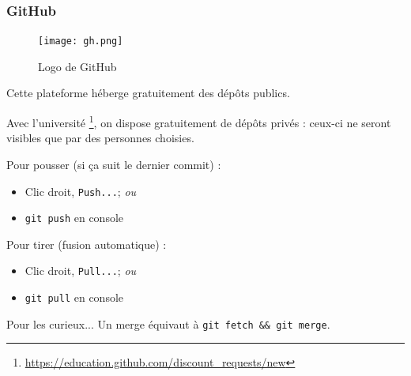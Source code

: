 \documentclass[compress]{beamer}
\newenvironment{curieux}
	{\begin{block}{Pour les curieux...}}
	{\end{block}}
\begin{document}
\begin{frame}
	\frametitle{GitHub}\label{f:gh}
	\begin{figure}[h]
		\centering
		\texttt{[image: gh.png]}
		\caption{Logo de GitHub}
	\end{figure}
	Cette plateforme héberge gratuitement des dépôts publics.

	Avec l'université
	\footnote{\url{https://education.github.com/discount_requests/new}},
	on dispose gratuitement de dépôts privés :
	ceux-ci ne seront visibles que par des personnes choisies.

	Pour pousser (si ça suit le dernier commit) :
	\begin{itemize}
		\item Clic droit, \texttt{Push...}; \textit{ou} %
		\item \texttt{git push} en console
	\end{itemize}

	Pour tirer (fusion automatique) :
	\begin{itemize}
		\item Clic droit, \texttt{Pull...}; \textit{ou} %
		\item \texttt{git pull} en console
	\end{itemize}

	\begin{curieux}
		Un merge équivaut à \texttt{git fetch && git merge}.
	\end{curieux}
\end{frame}
\end{document}

